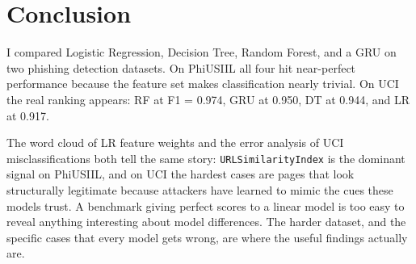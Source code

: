 \documentclass{article}
\begin{document}
\section{Conclusion}
\label{sec:conclusion}

I compared Logistic Regression, Decision Tree, Random Forest, and a GRU on two phishing detection datasets.
On PhiUSIIL all four hit near-perfect performance because the feature set makes classification nearly trivial.
On UCI the real ranking appears: RF at F1 = 0.974, GRU at 0.950, DT at 0.944, and LR at 0.917.

The word cloud of LR feature weights and the error analysis of UCI misclassifications both tell the same story: \texttt{URLSimilarityIndex} is the dominant signal on PhiUSIIL, and on UCI the hardest cases are pages that look structurally legitimate because attackers have learned to mimic the cues these models trust.
A benchmark giving perfect scores to a linear model is too easy to reveal anything interesting about model differences.
The harder dataset, and the specific cases that every model gets wrong, are where the useful findings actually are.
\end{document}
